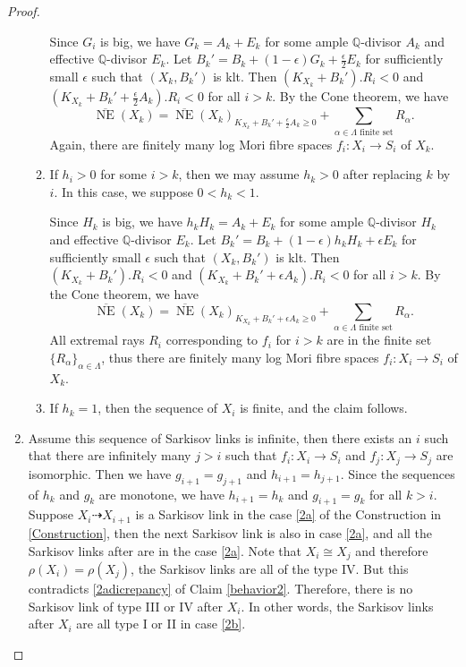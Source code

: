 \documentclass[11pt]{amsart}
\begin{document}
\begin{proof}
\begin{enumerate}
\begin{enumerate}
                  Since $G_{i}$ is big, we have $G_{k}=A_{k}+E_{k}$ for some ample $\mathbb{Q}$-divisor $A_{k}$ and effective $\mathbb{Q}$-divisor $E_{k}$. Let $B_{k}'=B_{k}+(1-\epsilon)G_{k}+\frac{\epsilon}{2} E_{k}$ for sufficiently small $\epsilon$ such that $(X_{k},B_{k}')$ is klt. Then $(K_{X_{k}}+B_{k}').R_{i}<0$ and $(K_{X_{k}}+B_{k}'+\frac{\epsilon}{2} A_{k}).R_{i}<0$ for all $i>k$. By the Cone theorem, we have
                  \[
                    \overline{\operatorname{NE}}(X_{k})=\overline{\operatorname{NE}}(X_{k})_{K_{X_{k}}+B_{k}'+\frac{\epsilon}{2}A_{k}\geqslant 0} +\sum_{\alpha \in\Lambda\text{ finite set}}R_{\alpha}.
                  \]
                  Again, there are finitely many log Mori fibre spaces $f_{i}:X_{i}\to S_{i}$ of $X_{k}$.

            \item If $h_i>0$ for some $i>k$, then we may assume $h_k>0$ after replacing $k$ by  $i$. In this case, we suppose $0<h_k<1$.

                  Since $H_{k}$ is big, we have $h_{k}H_{k}=A_{k}+E_{k}$ for some ample $\mathbb{Q}$-divisor $H_{k}$ and effective $\mathbb{Q}$-divisor  $E_{k}$. Let $B_{k}'=B_{k}+(1-\epsilon)h_{k}H_{k}+\epsilon E_{k}$ for sufficiently small $\epsilon$ such that $(X_{k},B_{k}')$ is klt. Then $(K_{X_{k}}+B_{k}').R_{i}<0$ and $(K_{X_{k}}+B_{k}'+\epsilon A_{k}).R_{i}<0$ for all $i>k$. By the Cone theorem, we have
                  \[
                    \overline{\operatorname{NE}}(X_{k})=\overline{\operatorname{NE}}(X_{k})_{K_{X_{k}}+B_{k}'+\epsilon A_{k}\geqslant 0} +\sum_{\alpha \in\Lambda\text{ finite set}}R_{\alpha}.
                  \]
                  All extremal rays $R_{i}$ corresponding to $f_{i}$ for $i>k$ are in the finite set $\{R_{\alpha}\}_{\alpha \in \Lambda} $, thus there are finitely many log Mori fibre spaces $f_{i}:X_{i}\to S_{i}$ of $X_{k}$.

            \item If $h_k=1$, then the sequence of $X_i$ is finite, and the claim follows.
          \end{enumerate}
    \item Assume this sequence of Sarkisov links is infinite, then there exists an  $i$ such that there are infinitely many $j>i$ such that $f_{i}:X_{i}\to S_{i}  $ and $f_{j}:X_{j}\to S_{j}$ are isomorphic. Then we have $g_{i+1}=g_{j+1}$ and $h_{i+1}=h_{j+1}$. Since the sequences of $h_{k}$ and $g_{k}$ are monotone, we have $h_{i+1}=h_{k}$ and  $g_{i+1}=g_{k}$ for all $k>i$. Suppose $X_{i}\dashrightarrow X_{i+1}$ is a Sarkisov link in the case \ref{2a} of the Construction in \ref{Construction}, then the next Sarkisov link is also in case \ref{2a}, and all the Sarkisov links after are in the case \ref{2a}. Note that $X_{i}\cong X_{j}$ and therefore $\rho(X_{i})=\rho(X_{j})$, the Sarkisov links are all of the type IV. But this contradicts \ref{2adicrepancy} of Claim \ref{behavior2}. Therefore, there is no Sarkisov link of type III or IV after $X_{i}$. In other words, the Sarkisov links after $X_{i}$ are all type I or II in case \ref{2b}.


\end{enumerate}
\end{proof}
\end{document}
